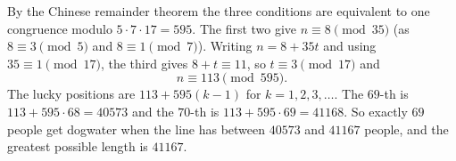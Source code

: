By the Chinese remainder theorem the three conditions are equivalent to one congruence modulo $5\cdot7\cdot17=595$. The first two give $n\equiv8\pmod{35}$ (as $8\equiv3\pmod5$ and $8\equiv1\pmod7$). Writing $n=8+35t$ and using $35\equiv1\pmod{17}$, the third gives $8+t\equiv11$, so $t\equiv3\pmod{17}$ and
\[n\equiv113\pmod{595}.\]
The lucky positions are $113+595(k-1)$ for $k=1,2,3,\dots$. The $69$-th is $113+595\cdot68=40573$ and the $70$-th is $113+595\cdot69=41168$. So exactly $69$ people get dogwater when the line has between $40573$ and $41167$ people, and the greatest possible length is $\boxed{41167}$.
